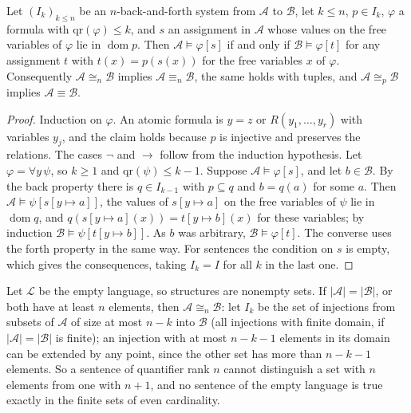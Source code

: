 \begin{theorem}\label{model-theory:theorem-fraisse}
Let $(I_k)_{k \leq n}$ be an $n$-back-and-forth system from $\mathcal{A}$ to $\mathcal{B}$, let $k \leq n$, $p \in I_k$, $\varphi$ a formula with
$\mathrm{qr}(\varphi) \leq k$, and $s$ an assignment in $\mathcal{A}$ whose values on the free variables of $\varphi$ lie in $\operatorname{dom}p$. Then
$\mathcal{A} \models \varphi[s]$ if and only if $\mathcal{B} \models \varphi[t]$ for any assignment $t$ with $t(x) = p(s(x))$ for the free variables $x$ of
$\varphi$. Consequently $\mathcal{A} \cong_n \mathcal{B}$ implies $\mathcal{A} \equiv_n \mathcal{B}$, the same holds with tuples, and
$\mathcal{A} \cong_p \mathcal{B}$ implies $\mathcal{A} \equiv \mathcal{B}$.
\end{theorem}

\begin{proof}
Induction on $\varphi$. An atomic formula is $y = z$ or $R(y_1, \ldots, y_r)$ with variables $y_j$, and the claim holds because $p$ is injective and
preserves the relations. The cases $\neg$ and $\to$ follow from the induction hypothesis. Let $\varphi = \forall y\,\psi$, so $k \geq 1$ and
$\mathrm{qr}(\psi) \leq k - 1$. Suppose $\mathcal{A} \models \varphi[s]$, and let $b \in \mathcal{B}$. By the back property there is $q \in I_{k-1}$ with
$p \subseteq q$ and $b = q(a)$ for some $a$. Then $\mathcal{A} \models \psi[s[y \mapsto a]]$, the values of $s[y \mapsto a]$ on the free variables of $\psi$ lie in
$\operatorname{dom}q$, and $q(s[y \mapsto a](x)) = t[y \mapsto b](x)$ for these variables; by induction $\mathcal{B} \models \psi[t[y \mapsto b]]$. As $b$ was
arbitrary, $\mathcal{B} \models \varphi[t]$. The converse uses the forth property in the same way. For sentences the condition on $s$ is empty, which gives
the consequences, taking $I_k = I$ for all $k$ in the last one.
\end{proof}

\begin{example}\label{model-theory:example-empty-language}
Let $\mathcal{L}$ be the empty language, so structures are nonempty sets. If $|\mathcal{A}| = |\mathcal{B}|$, or both have at least $n$ elements, then
$\mathcal{A} \cong_n \mathcal{B}$: let $I_k$ be the set of injections from subsets of $\mathcal{A}$ of size at most $n - k$ into $\mathcal{B}$ (all injections with
finite domain, if $|\mathcal{A}| = |\mathcal{B}|$ is finite); an injection with at most $n - k - 1$ elements in its domain can be extended by any point, since the
other set has more than $n - k - 1$ elements. So a sentence of quantifier rank $n$ cannot distinguish a set with $n$ elements from one with $n + 1$, and no
sentence of the empty language is true exactly in the finite sets of even cardinality.
\end{example}

